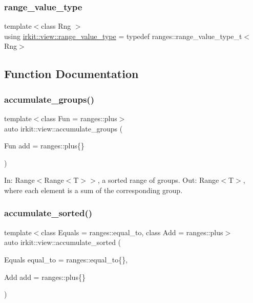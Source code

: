 \subsubsection{\texorpdfstring{range\+\_\+value\+\_\+type}{range\_value\_type}}
{\footnotesize\ttfamily template$<$class Rng $>$ \\
using \mbox{\hyperlink{namespaceirkit_1_1view_aa01f8ad24d5b6600bc31631b56448817}{irkit\+::view\+::range\+\_\+value\+\_\+type}} = typedef ranges\+::range\+\_\+value\+\_\+type\+\_\+t$<$Rng$>$}



\subsection{Function Documentation}
\mbox{\label{namespaceirkit_1_1view_a2833f7d6ed97305f13072bd8de6faedf}} 
\subsubsection{\texorpdfstring{accumulate\+\_\+groups()}{accumulate\_groups()}}
{\footnotesize\ttfamily template$<$class Fun  = ranges\+::plus$>$ \\
auto irkit\+::view\+::accumulate\+\_\+groups (\begin{DoxyParamCaption}\item[{Fun}]{add = {\ttfamily ranges\+:\+:plus\{\}} }\end{DoxyParamCaption})}

In\+: Range$<$Range$<$\+T$>$$>$, a sorted range of groups. Out\+: Range$<$\+T$>$, where each element is a sum of the corresponding group. \mbox{\label{namespaceirkit_1_1view_a11c6ca66beb07c9749c099501322bda9}} 
\subsubsection{\texorpdfstring{accumulate\+\_\+sorted()}{accumulate\_sorted()}}
{\footnotesize\ttfamily template$<$class Equals  = ranges\+::equal\+\_\+to, class Add  = ranges\+::plus$>$ \\
auto irkit\+::view\+::accumulate\+\_\+sorted (\begin{DoxyParamCaption}\item[{Equals}]{equal\+\_\+to = {\ttfamily ranges\+:\+:equal\+\_\+to\{\}},  }\item[{Add}]{add = {\ttfamily ranges\+:\+:plus\{\}} }\end{DoxyParamCaption})}


